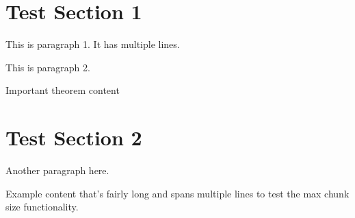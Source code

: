 \documentclass{article}
\begin{document}
\section{Test Section 1}
This is paragraph 1.
It has multiple lines.

This is paragraph 2.

\begin{theorem}
Important theorem content
\end{theorem}

\section{Test Section 2} 
Another paragraph here.

\begin{example}
Example content that's fairly long
and spans multiple lines to test
the max chunk size functionality.
\end{example}
\end{document}

